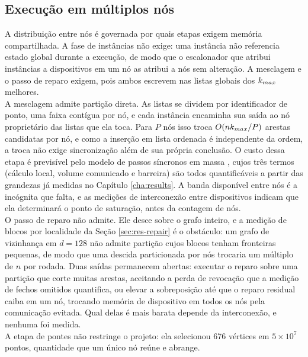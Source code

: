 \subsection{Execução em múltiplos nós\label{sec:fut-multinode}}

A distribuição entre nós é governada por quais etapas exigem memória compartilhada. A fase de instâncias não exige: uma instância não referencia estado global durante a execução, de modo que o escalonador que atribui instâncias a dispositivos em um nó as atribui a nós sem alteração. A mesclagem e o passo de reparo exigem, pois ambos escrevem nas listas globais dos $k_{max}$ melhores.\\

A mesclagem admite partição direta. As listas se dividem por identificador de ponto, uma faixa contígua por nó, e cada instância encaminha sua saída ao nó proprietário das listas que ela toca. Para $P$ nós isso troca $O(nk_{max}/P)$ arestas candidatas por nó, e como a inserção em lista ordenada é independente da ordem, a troca não exige sincronização além de sua própria conclusão. O custo dessa etapa é previsível pelo modelo de passos síncronos em massa \cite{bsp}, cujos três termos (cálculo local, volume comunicado e barreira) são todos quantificáveis a partir das grandezas já medidas no Capítulo \ref{cha:results}. A banda disponível entre nós é a incógnita que falta, e as medições de interconexão entre dispositivos \cite{gpu-interconnect} indicam que ela determinará o ponto de saturação, antes da contagem de nós.\\

O passo de reparo não admite. Ele desce sobre o grafo inteiro, e a medição de blocos por localidade da Seção \ref{sec:res-repair} é o obstáculo: um grafo de vizinhança em $d = 128$ não admite partição cujos blocos tenham fronteiras pequenas, de modo que uma descida particionada por nós trocaria um múltiplo de $n$ por rodada. Duas saídas permanecem abertas: executar o reparo sobre uma partição que corte muitas arestas, aceitando a perda de revocação que a medição de fechos omitidos quantifica, ou elevar a sobreposição até que o reparo residual caiba em um nó, trocando memória de dispositivo em todos os nós pela comunicação evitada. Qual delas é mais barata depende da interconexão, e nenhuma foi medida.\\

A etapa de pontes não restringe o projeto: ela selecionou 676 vértices em $5 \times 10^7$ pontos, quantidade que um único nó reúne e abrange.\\

